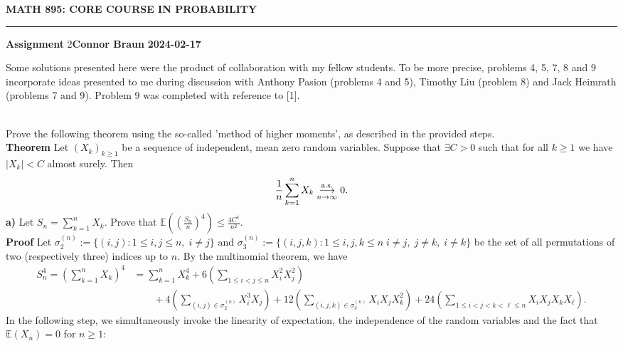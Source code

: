 \documentclass[10pt]{article}
\newcommand{\E}{\mathbb{E}}
\newcommand{\bp}[1]{\left({#1}\right)}
\newcommand{\1}[1]{\mathbbm{1}_{#1}}
\DeclareMathOperator{\as}{a.s.}
\begin{document}
    \begin{center}
        {\bf\large{MATH 895: CORE COURSE IN PROBABILITY}}
        \smallskip
        \hrule
        \smallskip
        {\bf Assignment} 2\hfill {\bf Connor Braun} \hfill {\bf 2024-02-17}
    \end{center}
    \begin{center}
        \begin{minipage}{\dimexpr\paperwidth-10cm}
            Some solutions presented here were the product of collaboration with my fellow students. To be more precise, problems 4, 5, 7, 8 and 9 incorporate ideas presented to me during discussion with Anthony Pasion (problems 4 and 5),
            Timothy Liu (problem 8) and Jack Heimrath (problems 7 and 9).
            Problem 9 was completed with reference to [1]. 
        \end{minipage}
    \end{center}
    \vspace{5pt}
    \\[5pt]
    Prove the following theorem using the so-called 'method of higher moments', as described in the provided steps.\\[5pt]
    {\bf Theorem}\hspace{5pt} Let $(X_k)_{k\geq 1}$ be a sequence of independent, mean zero random variables. Suppose that $\exists C>0$ such that
    for all $k\geq 1$ we have $|X_k|<C$ almost surely. Then
    \[\frac{1}{n}\sum_{k=1}^nX_k\overunderset{\as}{n\rightarrow\infty}{\longrightarrow}0.\] 
    {\bf a)}\hspace{5pt} Let $S_n=\sum_{k=1}^nX_k$. Prove that $\E\bp{\bp{\frac{S_n}{n}}^4}\leq \frac{4C^4}{n^2}$.\\[5pt]
    {\bf Proof}\hspace{5pt} Let $\sigma^{(n)}_2:=\{(i,j):1\leq i,j\leq n,\;i\neq j\}$ and $\sigma_3^{(n)}:=\{(i,j,k):1\leq i,j,k\leq n\;i\neq j,\;j\neq k,\;i\neq k\}$ be the set of all permutations of two (respectively three) indices up to $n$.
    By the multinomial theorem, we have
    \begin{align*}
        S_n^4=\bp{\sum_{k=1}^nX_k}^4&=\sum_{k=1}^nX_k^4+6\bp{\sum_{1\leq i<j\leq n}X_i^2X_j^2}\\
        &\qquad+4\bp{\sum_{(i,j)\in\sigma_2^{(n)}}X_i^3X_j}+12\bp{\sum_{(i,j,k)\in\sigma_3^{(n)}}X_iX_jX_k^2}+24\bp{\sum_{1\leq i<j<k<\ell\leq n}X_iX_jX_kX_{\ell}}.
    \end{align*}
    In the following step, we simultaneously invoke the linearity of expectation, the independence of the random variables and the fact that $\E(X_n)=0$ for $n\geq 1$:
\end{document}
